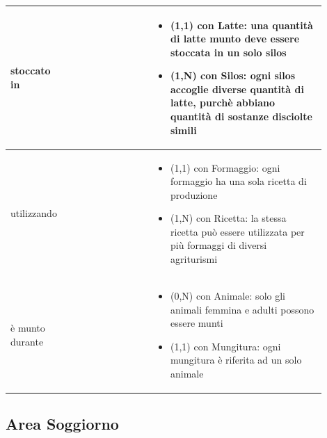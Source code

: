 \documentclass[12pt,a4paper]{article}
\begin{document}
\begin{center}
\begin{longtable}{|p{0.16\linewidth}|p{0.24\linewidth}|p{0.50\linewidth}|}
\hline
stoccato in 				& \begin{flushleft}\vspace{-15pt}  \end{flushleft}
					& \begin{itemize}
						\setlength{\itemindent}{-1em}
						\vspace{-25pt}
						\setlength\itemsep{-0.25em}
						\item (1,1) con Latte: una quantità di latte munto deve essere stoccata in un solo silos
						\item (1,N) con Silos: ogni silos accoglie diverse quantità di latte, purchè abbiano quantità di sostanze disciolte simili
					\end{itemize}\\ 

\hline
utilizzando 				& \begin{flushleft}\vspace{-15pt}  \end{flushleft}
					& \begin{itemize}
						\setlength{\itemindent}{-1em}
						\vspace{-25pt}
						\setlength\itemsep{-0.25em}
						\item (1,1) con Formaggio: ogni formaggio ha una sola ricetta di produzione
						\item (1,N) con Ricetta: la stessa ricetta può essere utilizzata per più formaggi di diversi agriturismi
					\end{itemize}\\ 

\hline
è munto durante 				& \begin{flushleft}\vspace{-15pt}  \end{flushleft}
					& \begin{itemize}
						\setlength{\itemindent}{-1em}
						\vspace{-25pt}
						\setlength\itemsep{-0.25em}
						\item (0,N) con Animale: solo gli animali femmina e adulti possono essere munti
						\item (1,1) con Mungitura: ogni mungitura è riferita ad un solo animale
					\end{itemize}\\ 

\hline

\end{longtable}
\end{center}
\pagebreak
\subsection{Area Soggiorno}
\end{document}
